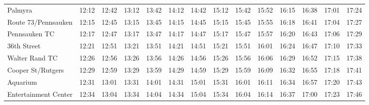 \begin{center}
\begin{tabular}{@{}lrrrrrrrrrrrrr@{}}
Palmyra & 12:12 & 12:42 & 13:12 & 13:42 & 14:12 & 14:42 & 15:12 & 15:42 & 15:52 & 16:15 & 16:38 & 17:01 & 17:24 \\
Route 73/Pennsauken & 12:15 & 12:45 & 13:15 & 13:45 & 14:15 & 14:45 & 15:15 & 15:45 & 15:55 & 16:18 & 16:41 & 17:04 & 17:27 \\
Pennsauken TC & 12:17 & 12:47 & 13:17 & 13:47 & 14:17 & 14:47 & 15:17 & 15:47 & 15:57 & 16:20 & 16:43 & 17:06 & 17:29 \\
36th Street & 12:21 & 12:51 & 13:21 & 13:51 & 14:21 & 14:51 & 15:21 & 15:51 & 16:01 & 16:24 & 16:47 & 17:10 & 17:33 \\
Walter Rand TC & 12:26 & 12:56 & 13:26 & 13:56 & 14:26 & 14:56 & 15:26 & 15:56 & 16:06 & 16:29 & 16:52 & 17:15 & 17:38 \\
Cooper St/Rutgers & 12:29 & 12:59 & 13:29 & 13:59 & 14:29 & 14:59 & 15:29 & 15:59 & 16:09 & 16:32 & 16:55 & 17:18 & 17:41 \\
Aquarium & 12:31 & 13:01 & 13:31 & 14:01 & 14:31 & 15:01 & 15:31 & 16:01 & 16:11 & 16:34 & 16:57 & 17:20 & 17:43 \\
Entertainment Center & 12:34 & 13:04 & 13:34 & 14:04 & 14:34 & 15:04 & 15:34 & 16:04 & 16:14 & 16:37 & 17:00 & 17:23 & 17:46 \\
\bottomrule\end{tabular}\end{center}

